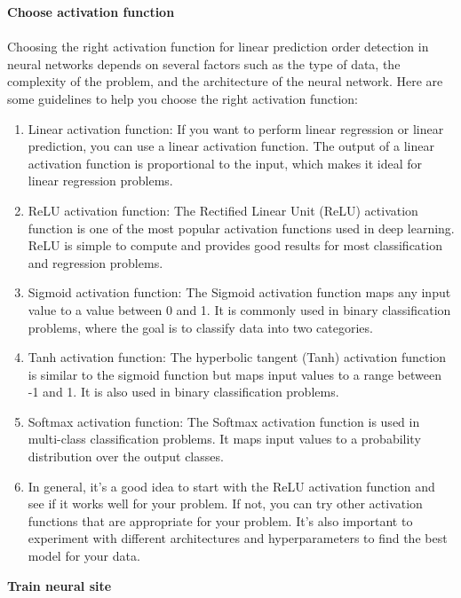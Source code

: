         \textbf{Choose activation function}\\
        \\
        Choosing the right activation function for linear prediction order detection in neural networks depends on several factors
        such as the type of data, the complexity of the problem, and the architecture of the neural network. Here are some
        guidelines to help you choose the right activation function:
        \begin{enumerate}
            \item Linear activation function: If you want to perform linear regression or linear prediction, you can use a linear activation function.
            The output of a linear activation function is proportional to the input, which makes it ideal for linear regression problems.
            \item ReLU activation function: The Rectified Linear Unit (ReLU) activation function is one of the most popular activation
            functions used in deep learning. ReLU is simple to compute and provides good results for most classification and regression problems.
            \item Sigmoid activation function: The Sigmoid activation function maps any input value to a value between 0 and 1. It is commonly
            used in binary classification problems, where the goal is to classify data into two categories.
            \item Tanh activation function: The hyperbolic tangent (Tanh) activation function is similar to the sigmoid function but maps
            input values to a range between -1 and 1. It is also used in binary classification problems.
            \item Softmax activation function: The Softmax activation function is used in multi-class classification problems. It maps input
            values to a probability distribution over the output classes.
            \item In general, it's a good idea to start with the ReLU activation function and see if it works well for your problem.
            If not, you can try other activation functions that are appropriate for your problem. It's also important to experiment with
            different architectures and hyperparameters to find the best model for your data.
        \end{enumerate}
        \textbf{Train neural site}\\
        \\
